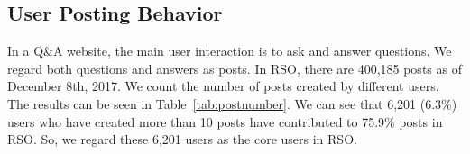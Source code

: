  
\subsection{User Posting Behavior}
\label{sec:userpostingbehavior}

In a Q\&A website, the main user interaction is to ask and answer questions.
We regard both questions and answers as posts.
In RSO, there are 400,185 posts as of December 8th, 2017.
We count the number of posts created by different users.
The results can be seen in Table~\ref{tab:postnumber}.
We can see that 6,201 (6.3\%) users who have created more than 10 posts have contributed to 75.9\% posts in RSO.
So, we regard these 6,201 users as the core users in RSO.

